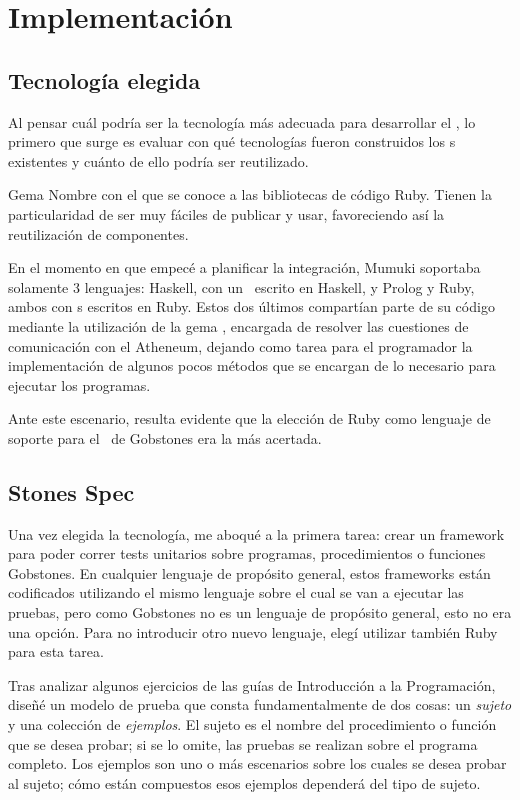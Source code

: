 
\section{Implementación}

\subsection{Tecnología elegida}
Al pensar cuál podría ser la tecnología más adecuada para desarrollar el \runner, lo primero que surge es evaluar con qué tecnologías fueron construidos los \runner s existentes y cuánto de ello podría ser reutilizado.

\sepfootnotecontent
  {Gema}
  {Nombre con el que se conoce a las bibliotecas de código Ruby. Tienen la particularidad de ser muy fáciles de publicar y usar, favoreciendo así la reutilización de componentes.}

En el momento en que empecé a planificar la integración, Mumuki soportaba solamente 3 lenguajes: Haskell, con un \runner\ escrito en Haskell, y Prolog y Ruby, ambos con \runner s escritos en Ruby. Estos dos últimos compartían parte de su código mediante la utilización de la gema \mumukit, encargada de resolver las cuestiones de comunicación con el Atheneum, dejando como tarea para el programador la implementación de algunos pocos métodos que se encargan de lo necesario para ejecutar los programas.

Ante este escenario, resulta evidente que la elección de Ruby como lenguaje de soporte para el \runner\ de Gobstones era la más acertada.

\subsection{Stones Spec}
Una vez elegida la tecnología, me aboqué a la primera tarea: crear un framework para poder correr tests unitarios sobre programas, procedimientos o funciones Gobstones. En cualquier lenguaje de propósito general, estos frameworks están codificados utilizando el mismo lenguaje sobre el cual se van a ejecutar las pruebas, pero como Gobstones no es un lenguaje de propósito general, esto no era una opción. Para no introducir otro nuevo lenguaje, elegí utilizar también Ruby para esta tarea.

Tras analizar algunos ejercicios de las guías de Introducción a la Programación, diseñé un modelo de prueba que consta fundamentalmente de dos cosas: un \emph{sujeto} y una colección de \emph{ejemplos}. El sujeto es el nombre del procedimiento o función que se desea probar; si se lo omite, las pruebas se realizan sobre el programa completo. Los ejemplos son uno o más escenarios sobre los cuales se desea probar al sujeto; cómo están compuestos esos ejemplos dependerá del tipo de sujeto.

